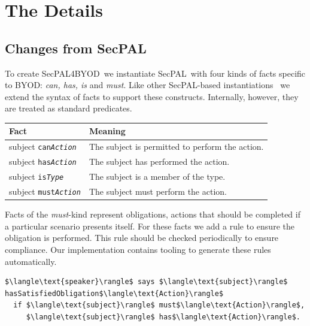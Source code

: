 \documentclass{llncs}
\newcommand{\AppPAL}[0]{SecPAL4BYOD}
\begin{document}
\section{The Details}
\label{sec:details}

\subsection{Changes from SecPAL}
\label{ssec:changes}

To create \AppPAL~we instantiate SecPAL~with four kinds of facts specific to BYOD: \emph{can, has, is} and \emph{must}.
Like other SecPAL-based instantiations~\cite{becker_framework_2009,aziz_secpal4dsa:_2011} we extend the syntax of facts to support these constructs.
Internally, however, they are treated as standard predicates.

\begin{center}
  \footnotesize\sffamily
  \newcommand{\predicate}[3]{#1 \texttt{#2\textit{#3}}}
  \begin{tabular}{l l}
    \toprule
    Fact                              & Meaning                                         \\
    \midrule
    \predicate{subject}{can}{Action}  & The subject is permitted to perform the action. \\
    \predicate{subject}{has}{Action}  & The subject has performed the action.           \\
    \predicate{subject}{is}{Type}     & The subject is a member of the type.            \\
    \predicate{subject}{must}{Action} & The subject must perform the action.            \\
    \bottomrule
  \end{tabular}
\end{center}

Facts of the \emph{must}-kind represent obligations, actions that should be completed if a particular scenario presents itself.
For these facts we add a rule to ensure the obligation is performed.
This rule should be checked periodically to ensure compliance.
Our implementation contains tooling to generate these rules automatically.
\begin{lstlisting}
$\langle\text{speaker}\rangle$ says $\langle\text{subject}\rangle$ hasSatisfiedObligation$\langle\text{Action}\rangle$
  if $\langle\text{subject}\rangle$ must$\langle\text{Action}\rangle$,
     $\langle\text{subject}\rangle$ has$\langle\text{Action}\rangle$.
\end{lstlisting}
\end{document}
